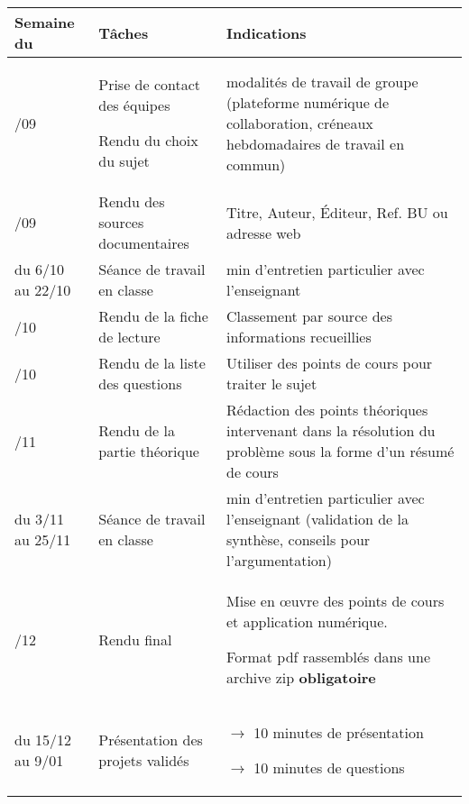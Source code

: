 \begin{center}
\begin{tabular}{|p{}|p{}|p{}|}
\hline
\size Semaine du	& \size Tâches						& \size Indications\\
\hline
\hline
\color {red}\size 22/09 \color {black} & \size Prise de contact des équipes \par Rendu du choix du sujet	& \size modalités de travail de groupe (plateforme numérique de collaboration, créneaux hebdomadaires de travail en commun)\\
\hline
\size 29/09		& \size Rendu des sources documentaires 		& \size Titre, Auteur, Éditeur, Ref. BU ou adresse web \\
\hline
\size du 6/10 au 22/10	& \size Séance de travail en classe 	& \size 30 min d'entretien particulier avec l'enseignant\e \\
\hline
\size 20/10		& \size Rendu de la fiche de lecture	& \size Classement par source des informations recueillies \\
\hline
\size 27/10		& \size Rendu de la liste des questions	& \size Utiliser des points de cours  pour traiter le sujet \\
\hline
\size 10/11		& \size Rendu de la partie théorique	& \size Rédaction des points théoriques intervenant dans la résolution du problème sous la forme d'un résumé de cours \\	\hline
\size du 3/11 au 25/11	& \size Séance de travail en classe 	& \size 30 min d'entretien particulier avec l'enseignant (validation de la synthèse, conseils pour l'argumentation)\\
\hline
\size 8/12		& \size Rendu final & \size Mise en \oe uvre des points de cours et application numérique. \par Format pdf rassemblés dans une archive zip \textbf{obligatoire}\\
\hline
\size du 15/12 au 9/01 & \size Présentation des projets validés & \size $\rightarrow$ 10 minutes de présentation \par $\rightarrow$ 10 minutes de questions\\
\hline
\end{tabular}
\end{center}
